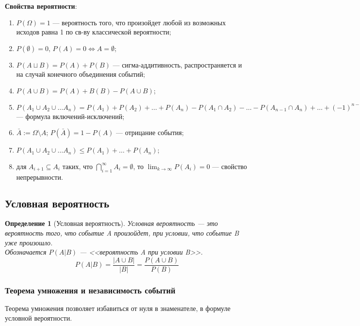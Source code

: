 \documentclass{article}
\theoremstyle{mydef}
\newtheorem{definition}{Определение}
\begin{document}
\textbf{Свойства вероятности}:
\begin{enumerate}
    \item $P(\Omega) = 1$ --- вероятность того, что произойдет любой из возможных исходов равна 1 по св-ву классической вероятности;
    \item $P(\emptyset) = 0$, $P(A) = 0 \Leftrightarrow  A = \emptyset$;
    \item $P(A \sqcup B) = P(A) + P(B)$ --- сигма-аддитивность, распространяется и на случай конечного объединения событий;
    \item $P(A \cup B) = P(A) + B(B) - P(A \cup B)$;
    \item $P(A_1 \cup A_2 \cup \ldots A_n) = P(A_1) + P(A_2) + \ldots + P(A_n) - P(A_1 \cap A_2) - \ldots - P(A_{n-1} \cap A_n) + \ldots + (-1)^{n-1} P(A_1 \cap \ldots \cap A_n)$ --- формула включений-исключений;
    \item $\bar{A} := \Omega \setminus A$; $P(\bar{A}) = 1 - P(A)$ --- отрицание события; 
    \item $P(A_1 \cup A_2 \cup \ldots A_n) \leq P(A_1) + \ldots + P(A_n)$;
    \item для $A_{i+1} \subseteq A_i$ таких, что $\bigcap_{i=1}^{\infty} A_i = \emptyset$, то $\lim_{k \to \infty} P(A_i) = 0$ --- свойство непрерывности. 
\end{enumerate}

\subsection{Условная вероятность}
 
\begin{definition}[Условная вероятность]
    Условная вероятность --- это вероятность того, что событие A произойдет, при условии, что событие B уже произошло. \\
    Обозначается $P(A|B)$ --- <<вероятность A при условии B>>. \\
    \begin{equation}
        P(A|B) = \frac{|A\cup B|}{|B|} = \frac{P(A \cup B)}{P(B)}
    \end{equation}
\end{definition}

\subsubsection{Теорема умножения и независимость событий}

Теорема умножения позволяет избавиться от нуля в знаменателе, в формуле условной вероятности.
\end{document}
